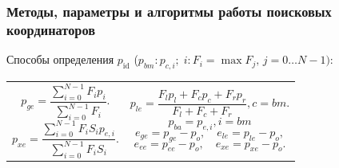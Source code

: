 \documentclass[10pt,utf8]{beamer}
\newlength\TW
\begin{document}

\begin{frame}
  \frametitle{Методы, параметры и алгоритмы работы поисковых координаторов }

  Способы определения $p_\mathrm{id}$ ($p_{bm}: p_{c,i}; \; i : F_i = \max{F_j}, \, j=0 \ldots N-1 )$:

  \begin{tabular}{p{40\TW}|p{58\TW}}
  \begin{equation}
    p_{ge}
    =
    \frac{\sum\limits_{i=0}^{N-1} F_{i} p_{i}}
         {\sum\limits_{i=0}^{N-1} F_{i} }
    .
    \label{atu:eq:p_ge}
  \end{equation}
  \begin{equation}
    p_{xe}
    =
    \frac{\sum\limits_{i=0}^{N-1} F_{i} S_i p_{e,i}}
         {\sum\limits_{i=0}^{N-1} F_{i} S_i }
    .
    \label{atu:eq:p_xe}
  \end{equation}
  &
  \begin{equation}
    p_{le}
    =
    \frac{ F_{l} p_{l} + F_{c} p_{c} + F_{r} p_{r} }
       { F_{l}       + F_{c}       + F_{r}       }
    ,
    c = bm.
    \label{atu:eq:p_lel}
  \end{equation}
  \begin{equation}
      p_{ba} = p_{e,i}, i = bm
      \label{atu:eq:p_ba}
    \end{equation}
  \[
      e_{ge} = p_{ge} - p_o,
      \quad
      e_{le} = p_{le} - p_o,
  \]
  \begin{equation}
      e_{ee} = p_{ee} - p_o,
      \quad
      e_{xe} = p_{xe} - p_o.
      \label{atu:eq:e_xx}
    \end{equation}
  \end{tabular}

\end{frame}



\end{document}
